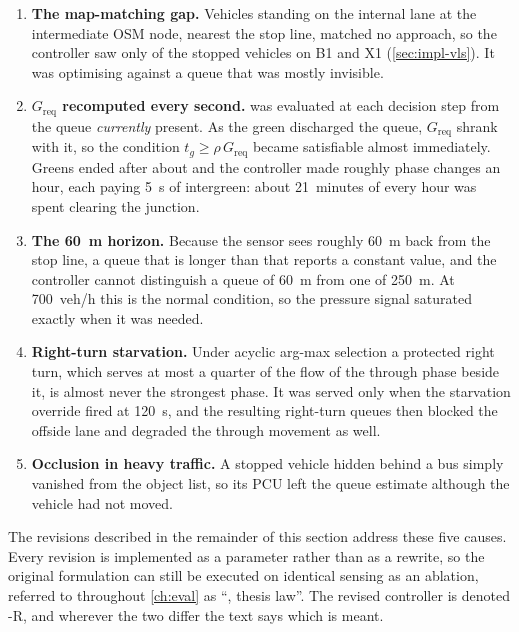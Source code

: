\begin{enumerate}[leftmargin=*,itemsep=2pt]
  \item \textbf{The map-matching gap.} Vehicles standing on the internal lane at the intermediate OSM node,
        nearest the stop line, matched no approach, so the controller saw only  of the stopped
        vehicles on B1 and X1 (\cref{sec:impl-vls}). It was optimising against a queue that was mostly
        invisible.
  \item \textbf{$G_{\text{req}}$ recomputed every second.}  was evaluated at each decision step
        from the queue \emph{currently} present. As the green discharged the queue, $G_{\text{req}}$ shrank
        with it, so the condition $t_g \geq \rho\,G_{\text{req}}$ became satisfiable almost immediately. Greens
        ended after about  and the controller made roughly  phase changes an hour, each
        paying 5~s of intergreen: about 21~minutes of every hour was spent clearing the junction.
  \item \textbf{The 60~m horizon.} Because the sensor sees roughly 60~m back from the stop line, a queue that
        is longer than that reports a constant value, and the controller cannot distinguish a queue of 60~m
        from one of 250~m. At 700~veh/h this is the normal condition, so the pressure signal saturated exactly
        when it was needed.
  \item \textbf{Right-turn starvation.} Under acyclic arg-max selection a protected right turn, which serves
        at most a quarter of the flow of the through phase beside it, is almost never the strongest phase. It
        was served only when the starvation override fired at 120~s, and the resulting right-turn queues then
        blocked the offside lane and degraded the through movement as well.
  \item \textbf{Occlusion in heavy traffic.} A stopped vehicle hidden behind a bus simply vanished from the
        object list, so its PCU left the queue estimate although the vehicle had not moved.
\end{enumerate}

The revisions described in the remainder of this section address these five causes. Every revision is
implemented as a parameter rather than as a rewrite, so the original formulation can still be executed on
identical sensing as an ablation, referred to throughout \cref{ch:eval} as ``\prism{}, thesis law''. The
revised controller is denoted \prism{}-R, and wherever the two differ the text says which is meant.

